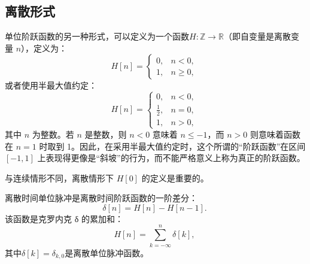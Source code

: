 \subsection{离散形式}
单位阶跃函数的另一种形式，可以定义为一个函数$H : \mathbb{Z} \to \mathbb{R}$（即自变量是离散变量 $n$），定义为：
$$
H[n] =
\begin{cases}
0, & n < 0, \\[6pt]
1, & n \geq 0,
\end{cases}~
$$
或者使用半最大值约定：
$$
H[n] =
\begin{cases}
0, & n < 0, \\[6pt]
\tfrac{1}{2}, & n = 0, \\[6pt]
1, & n > 0,
\end{cases}~
$$
其中 $n$ 为整数。若 $n$ 是整数，则 $n < 0$ 意味着 $n \leq -1$，而 $n > 0$ 则意味着函数在 $n = 1$ 时取到 1。因此，在采用半最大值约定时，这个所谓的“阶跃函数”在区间 $[-1,1]$ 上表现得更像是“斜坡”的行为，而不能严格意义上称为真正的阶跃函数。

与连续情形不同，离散情形下 $H[0]$ 的定义是重要的。

离散时间单位脉冲是离散时间阶跃函数的一阶差分：
$$
\delta[n] = H[n] - H[n-1].~
$$
该函数是克罗内克 δ 的累加和：
$$
H[n] = \sum_{k=-\infty}^{n} \delta[k],~
$$
其中$\delta[k] = \delta_{k,0}$是离散单位脉冲函数。
